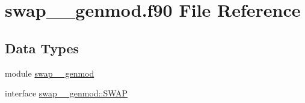 \hypertarget{swap____genmod_8f90}{\section{swap\+\_\+\+\_\+genmod.\+f90 File Reference}
\label{swap____genmod_8f90}
}
\subsection*{Data Types}
\begin{DoxyCompactItemize}
\item 
module \hyperlink{classswap____genmod}{swap\+\_\+\+\_\+genmod}
\item 
interface \hyperlink{interfaceswap____genmod_1_1SWAP}{swap\+\_\+\+\_\+genmod\+::\+S\+W\+A\+P}
\end{DoxyCompactItemize}
